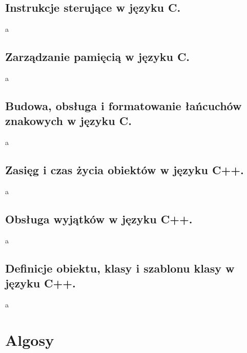 \documentclass[a4paper,12pt,oneside]{book}
\begin{document}
			\subsection{\color{red}Instrukcje sterujące w języku C.}
				a
			\newpage\subsection{\color{red}Zarządzanie pamięcią w języku C.}
				a
			\newpage\subsection{\color{red}Budowa, obsługa i formatowanie łańcuchów znakowych w języku C.}
				a
			\newpage\subsection{\color{red}Zasięg i czas życia obiektów w języku C++.}
				a
			\newpage\subsection{\color{red}Obsługa wyjątków w języku C++.}
				a
			\newpage\subsection{\color{red}Definicje obiektu, klasy i szablonu klasy w języku C++.}
				a
		
		\newpage\section{Algosy}
\end{document}
